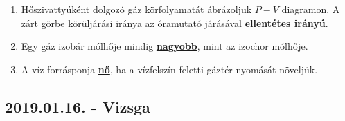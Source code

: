 \documentclass[../../fizika_kerdesek.tex]{subfiles}
\begin{document}
{\begin{enumerate}
                \item Hőszivattyúként dolgozó gáz körfolyamatát ábrázoljuk $P-V$ diagramon. A zárt görbe körüljárási iránya az óramutató járásával \underline{\textbf{ellentétes irányú}}.
                \item Egy gáz izobár mólhője mindig \underline{\textbf{nagyobb}}, mint az izochor mólhője. 
                \item A víz forrásponja \underline{\textbf{nő}}, ha a vízfelszín feletti gáztér nyomását növeljük.
            \end{enumerate}}

    \subsection{2019.01.16. - Vizsga}
\end{document}
